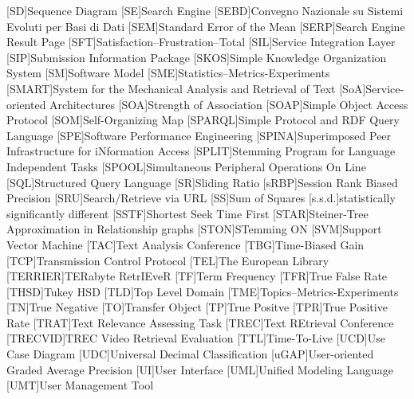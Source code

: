 [SD]{Sequence Diagram}
[SE]{Search Engine}
[SEBD]{Convegno Nazionale su Sistemi Evoluti per Basi di Dati}
[SEM]{Standard Error of the Mean}
[SERP]{Search Engine Result Page}
[SFT]{Satisfaction--Frustration--Total}
[SIL]{Service Integration Layer}
[SIP]{Submission Information Package}
[SKOS]{Simple Knowledge Organization System}
[SM]{Software Model}
[SME]{Statistics--Metrics-Experiments}
[SMART]{System for the Mechanical Analysis and Retrieval of Text}
[SoA]{Service-oriented Architectures}
[SOA]{Strength of Association}
[SOAP]{Simple Object Access Protocol}
[SOM]{Self-Organizing Map}
[SPARQL]{Simple Protocol and RDF Query Language}
[SPE]{Software Performance Engineering}
[SPINA]{Superimposed Peer Infrastructure for iNformation Access}
[SPLIT]{Stemming Program for Language Independent Tasks}
[SPOOL]{Simultaneous Peripheral Operations On Line}
[SQL]{Structured Query Language}
[SR]{Sliding Ratio}
[sRBP]{Session Rank Biased Precision}
[SRU]{Search/Retrieve via \acs{URL}}
[SS]{Sum of Squares}
[s.s.d.]{statistically significantly different}
[SSTF]{Shortest Seek Time First}
[STAR]{Steiner-Tree Approximation in Relationship graphs}
[STON]{STemming ON}
[SVM]{Support Vector Machine}
[TAC]{Text Analysis Conference}
[TBG]{Time-Biased Gain}
[TCP]{Transmission Control Protocol}
[TEL]{The European Library}
[TERRIER]{TERabyte RetrIEveR}
[TF]{Term Frequency}
[TFR]{True False Rate}
[THSD]{Tukey HSD}
[TLD]{Top Level Domain}
[TME]{Topics--Metrics-Experiments}
[TN]{True Negative}
[TO]{Transfer Object}
[TP]{True Positve}
[TPR]{True Positive Rate}
[TRAT]{Text Relevance Assessing Task}
[TREC]{Text REtrieval Conference}
[TRECVID]{TREC Video Retrieval Evaluation}
[TTL]{Time-To-Live}
[UCD]{Use Case Diagram}
[UDC]{Universal Decimal Classification}
[uGAP]{User-oriented Graded Average Precision}
[UI]{User Interface}
[UML]{Unified Modeling Language}
[UMT]{User Management Tool}

